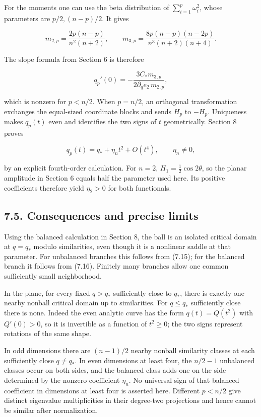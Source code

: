\documentclass[11pt]{article}
\begin{document}
For the moments one can use the beta distribution of
\(\sum_{i=1}^p\omega_i^2\), whose parameters are \(p/2,(n-p)/2\). It
gives

\[
m_{2,p}=\frac{2p(n-p)}{n^2(n+2)},\qquad
m_{3,p}=\frac{8p(n-p)(n-2p)}{n^3(n+2)(n+4)}.
\tag{7.14}
\]

The slope formula from Section 6 is therefore

\[
q_p'(0)=-\frac{3C_*m_{3,p}}{2\partial_qe_2\,m_{2,p}},
\tag{7.15}
\]

which is nonzero for \(p<n/2\). When \(p=n/2\), an orthogonal
transformation exchanges the equal-sized coordinate blocks and sends
\(H_p\) to \(-H_p\). Uniqueness makes \(q_p(t)\) even and identifies the
two signs of \(t\) geometrically. Section 8 proves

\[
q_p(t)=q_*+\eta_nt^2+O(t^4),\qquad \eta_n\ne0,
\tag{7.16}
\]

by an explicit fourth-order calculation. For \(n=2\),
\(H_1=\tfrac12\cos2\theta\), so the planar amplitude in Section 6 equals
half the parameter used here. Its positive coefficients therefore yield
\(\eta_2>0\) for both functionals.

\subsection{7.5. Consequences and precise
limits}\label{consequences-and-precise-limits}

Using the balanced calculation in Section 8, the ball is an isolated
critical domain at \(q=q_*\) modulo similarities, even though it is a
nonlinear saddle at that parameter. For unbalanced branches this follows
from (7.15); for the balanced branch it follows from (7.16). Finitely
many branches allow one common sufficiently small neighborhood.

In the plane, for every fixed \(q>q_*\) sufficiently close to \(q_*\),
there is exactly one nearby nonball critical domain up to similarities.
For \(q\le q_*\) sufficiently close there is none. Indeed the even
analytic curve has the form \(q(t)=Q(t^2)\) with \(Q'(0)>0\), so it is
invertible as a function of \(t^2\ge0\); the two signs represent
rotations of the same shape.

In odd dimensions there are \((n-1)/2\) nearby nonball similarity
classes at each sufficiently close \(q\ne q_*\). In even dimensions at
least four, the \(n/2-1\) unbalanced classes occur on both sides, and
the balanced class adds one on the side determined by the nonzero
coefficient \(\eta_n\). No universal sign of that balanced coefficient
in dimensions at least four is asserted here. Different \(p<n/2\) give
distinct eigenvalue multiplicities in their degree-two projections and
hence cannot be similar after normalization.
\end{document}
